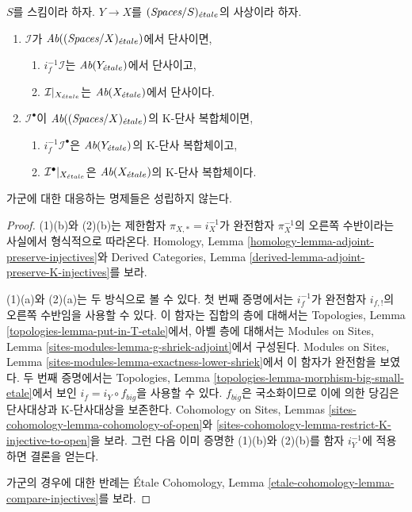 \begin{lemma}
\label{lemma-compare-injectives}
$S$를 스킴이라 하자.
$Y \to X$를 $(\textit{Spaces}/S)_{\acute{e}tale}$의 사상이라 하자.
\begin{enumerate}
\item $\mathcal{I}$가
$\textit{Ab}((\textit{Spaces}/X)_{\acute{e}tale})$에서 단사이면,
\begin{enumerate}
\item $i_f^{-1}\mathcal{I}$는 $\textit{Ab}(Y_{\acute{e}tale})$에서 단사이고,
\item $\mathcal{I}|_{X_{\acute{e}tale}}$는 $\textit{Ab}(X_{\acute{e}tale})$에서 단사이다.
\end{enumerate}
\item $\mathcal{I}^\bullet$이
$\textit{Ab}((\textit{Spaces}/X)_{\acute{e}tale})$의 K-단사 복합체이면,
\begin{enumerate}
\item $i_f^{-1}\mathcal{I}^\bullet$은
$\textit{Ab}(Y_{\acute{e}tale})$의 K-단사 복합체이고,
\item $\mathcal{I}^\bullet|_{X_{\acute{e}tale}}$은
$\textit{Ab}(X_{\acute{e}tale})$의 K-단사 복합체이다.
\end{enumerate}
\end{enumerate}
가군에 대한 대응하는 명제들은 성립하지 않는다.
\end{lemma}

\begin{proof}
(1)(b)와 (2)(b)는 제한함자 $\pi_{X, *} = i_X^{-1}$가 완전함자
$\pi_X^{-1}$의 오른쪽 수반이라는 사실에서 형식적으로 따라온다.
Homology, Lemma \ref{homology-lemma-adjoint-preserve-injectives}와
Derived Categories, Lemma
\ref{derived-lemma-adjoint-preserve-K-injectives}를 보라.

\medskip\noindent
(1)(a)와 (2)(a)는 두 방식으로 볼 수 있다. 첫 번째 증명에서는
$i_f^{-1}$가 완전함자 $i_{f, !}$의 오른쪽 수반임을 사용할 수 있다.
이 함자는 집합의 층에 대해서는 Topologies, Lemma
\ref{topologies-lemma-put-in-T-etale}에서, 아벨 층에 대해서는
Modules on Sites, Lemma
\ref{sites-modules-lemma-g-shriek-adjoint}에서 구성된다.
Modules on Sites, Lemma
\ref{sites-modules-lemma-exactness-lower-shriek}에서 이 함자가 완전함을
보였다. 두 번째 증명에서는 Topologies, Lemma
\ref{topologies-lemma-morphism-big-small-etale}에서 보인
$i_f = i_Y \circ f_{big}$을 사용할 수 있다.
$f_{big}$은 국소화이므로 이에 의한 당김은 단사대상과 K-단사대상을
보존한다. Cohomology on Sites, Lemmas
\ref{sites-cohomology-lemma-cohomology-of-open}와
\ref{sites-cohomology-lemma-restrict-K-injective-to-open}을 보라.
그런 다음 이미 증명한 (1)(b)와 (2)(b)를 함자 $i_Y^{-1}$에 적용하면
결론을 얻는다.

\medskip\noindent
가군의 경우에 대한 반례는 \'Etale Cohomology, Lemma
\ref{etale-cohomology-lemma-compare-injectives}를 보라.
\end{proof}

